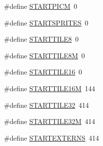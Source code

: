 \begin{DoxyCompactItemize}
\#define \hyperlink{GFXE__SOD_8H_abd418cd2e72de01524b8400b58ad8273}{STARTPICM}~0
\item 
\#define \hyperlink{GFXE__SOD_8H_a08f15ca2b66024c7df43a601df18e33a}{STARTSPRITES}~0
\item 
\#define \hyperlink{GFXE__SOD_8H_a63a36c8955b74ee16ba0fc61f4d62478}{STARTTILE8}~0
\item 
\#define \hyperlink{GFXE__SOD_8H_a56df7bfae7e081f1fe22c67f356c0f12}{STARTTILE8M}~0
\item 
\#define \hyperlink{GFXE__SOD_8H_adde5c841b7c315dca1c114be851a14bf}{STARTTILE16}~0
\item 
\#define \hyperlink{GFXE__SOD_8H_a8158cbe2ebd8e9f311fd7637be063176}{STARTTILE16M}~144
\item 
\#define \hyperlink{GFXE__SOD_8H_afdb080cedc6a487f761df7481033e345}{STARTTILE32}~414
\item 
\#define \hyperlink{GFXE__SOD_8H_a04e773bd033b5375cb82a2bc5142eb3a}{STARTTILE32M}~414
\item 
\#define \hyperlink{GFXE__SOD_8H_a4bab9c7dbc3408ece8bf42a298f4a0ad}{STARTEXTERNS}~414
\end{DoxyCompactItemize}
